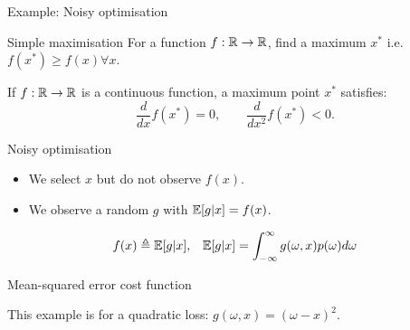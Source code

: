 \documentclass[smaller]{beamer}
\begin{document}
\begin{frame}[label={sec:orgbb7b3db}]{Example: Noisy optimisation}
\begin{block}{Simple maximisation}
For a function \(f : \mathbb{R} \to \mathbb{R}\), find a maximum \(x^*\) i.e. \(f(x^*) \geq f(x) \forall x\).

\pause
\end{block}
\begin{theorem}
If \(f: \mathbb{R} \to \mathbb{R}\) is a continuous function, a maximum point \(x^*\) satisfies:
\[
\frac{d}{dx} f(x^*) = 0,
\qquad
\frac{d}{dx^2} f(x^*) < 0.
\]

\pause
\end{theorem}
\begin{block}{Noisy optimisation}
\begin{itemize}
\item We select \(x\) but \alert{do not} observe \(f(x)\).
\item We observe a \alert{random} \(g\) with \(\mathop{\mbox{\ensuremath{\mathbb{E}}}}\nolimits[g | x] = f(x)\).
\end{itemize}
\begin{align}
f(x) &\mathrel{\triangleq} \mathop{\mbox{\ensuremath{\mathbb{E}}}}\nolimits[g | x],
&
\mathop{\mbox{\ensuremath{\mathbb{E}}}}\nolimits[g | x] = \int_{- \infty}^\infty g(\omega, x) p(\omega) d\omega
\end{align}
\end{block}
\end{frame}





\begin{frame}[label={sec:orgf3f9ca2}]{Mean-squared error cost function}
This example is for a quadratic loss: \(g(\omega, x) = (\omega - x)^2\).
\end{frame}
\end{document}
